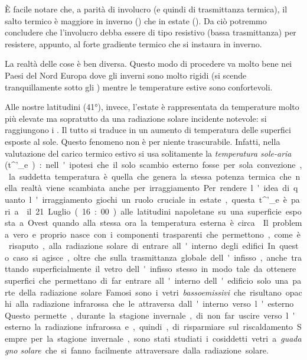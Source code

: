 È facile notare che, a parità di involucro (e quindi di trasmittanza termica), il salto termico è maggiore in inverno () che in estate (). Da ciò potremmo concludere che l'involucro debba essere di tipo resistivo (bassa trasmittanza) per resistere, appunto, al forte gradiente termico che si instaura in inverno. 

La realtà delle cose è ben diversa. Questo modo di procedere va molto bene nei Paesi del Nord Europa dove gli inverni sono molto rigidi (si scende tranquillamente sotto gli ) mentre le temperature estive sono confortevoli.

Alle nostre latitudini (\ang{41}), invece, l'estate è rappresentata da temperature molto più elevate ma sopratutto da una radiazione solare incidente notevole: si raggiungono i . Il tutto si traduce in un aumento di temperatura delle superfici esposte al sole. Questo fenomeno non è per niente trascurabile. Infatti, nella valutazione del carico termico estivo si usa solitamente la \emph{temperatura sole-aria} (\si{t^'_e}): nell'ipotesi che il solo scambio esterno fosse per sola convezione, la suddetta temperatura è quella che genera la stessa potenza termica che nella realtà viene scambiata anche per irraggiamento.

Per rendere l'idea di quanto l'irraggiamento giochi un ruolo cruciale in estate, questa \si{t^'_e} è pari a  il 21 Luglio (16:00) alle latitudini napoletane su una superficie esposta a Ovest quando alla stessa ora la temperatura esterna è circa . 

Il problema vero e proprio nasce con i componenti trasparenti che permettono, come è risaputo, alla radiazione solare di entrare all'interno degli edifici.

In questo caso si agisce, oltre che sulla trasmittanza globale dell'infisso, anche trattando superficialmente il vetro dell'infisso stesso in modo tale da ottenere superfici che permettano di far entrare all'interno dell'edificio solo una parte della radiazione solare.

Famosi sono i vetri \emph{bassoemissivi} che risultano opachi alla radiazione infrarossa che le attraversa dall'interno verso l'esterno. Questo permette, durante la stagione invernale, di non far uscire verso l'esterno la radiazione infrarossa e, quindi, di risparmiare sul riscaldamento. 

Sempre per la stagione invernale, sono stati studiati i cosiddetti vetri a \emph{guadagno solare} che si fanno facilmente attraversare dalla radiazione solare. 

